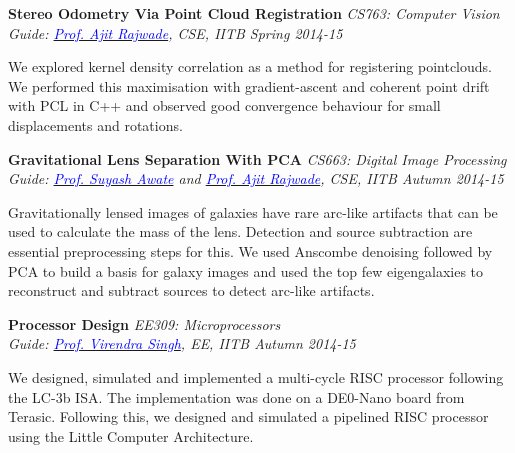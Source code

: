 \documentclass[margin,line]{res}
\newenvironment{list1}{
  \begin{list}{\ding{113}}{%
      \setlength{\itemsep}{0in}
      \setlength{\parsep}{0in} \setlength{\parskip}{0in}
      \setlength{\topsep}{0in} \setlength{\partopsep}{0in} 
      \setlength{\leftmargin}{0.17in}}}{\end{list}}
\begin{document}
\begin{resume}
\vspace*{-0.1in}

{\bf Stereo Odometry Via Point Cloud Registration} \hfill \textit{CS763: Computer Vision} \\
{\em Guide: \href{https://www.cse.iitb.ac.in/~ajitvr}{\textcolor{blue}{Prof. Ajit Rajwade}}, CSE, IITB \hfill Spring 2014-15} \\
\vspace*{-.15in}
\begin{list1}
\item[] We explored kernel density correlation as a method for registering pointclouds. We performed this maximisation with gradient-ascent and coherent point drift with PCL in C++ and observed good convergence behaviour for small displacements and rotations.
\end{list1}

\vspace*{-0.1in}

{\bf Gravitational Lens Separation With PCA} \hfill \textit{CS663: Digital Image Processing} \\
{\em Guide: \href{https://www.cse.iitb.ac.in/~suyash}{\textcolor{blue}{Prof. Suyash Awate}} and \href{https://www.cse.iitb.ac.in/~ajitvr}{\textcolor{blue}{Prof. Ajit Rajwade}}, CSE, IITB \hfill Autumn 2014-15} \\
\vspace*{-.15in}
\begin{list1}
\item[] Gravitationally lensed images of galaxies have rare arc-like artifacts that can be used to calculate the mass of the lens. Detection and source subtraction are essential preprocessing steps for this. We used Anscombe denoising followed by PCA to build a basis for galaxy images and used the top few eigengalaxies to reconstruct and subtract sources to detect arc-like artifacts.
\end{list1}

\vspace*{-0.1in}

{\bf Processor Design} \hfill \textit{EE309: Microprocessors} \\
{\em Guide: \href{https://www.ee.iitb.ac.in/~viren/}{\textcolor{blue}{Prof. Virendra Singh}}, EE, IITB \hfill Autumn 2014-15} \\
\vspace*{-.15in}
\begin{list1}
\item[] We designed, simulated and implemented a multi-cycle RISC processor following the LC-3b ISA. The implementation was done on a DE0-Nano board from Terasic. Following this, we designed and simulated a pipelined RISC processor using the Little Computer Architecture.
\end{list1}


\end{resume}
\end{document}
